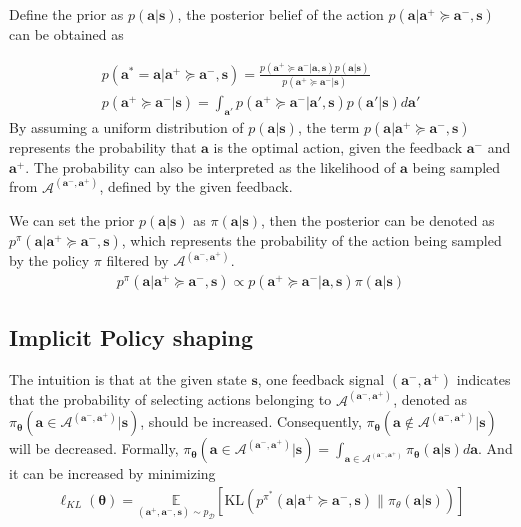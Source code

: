 Define the prior as $p(\bm a | \bm s)$,
the posterior belief of the action $ p (  \bm a |\bm a^+ \succeq \bm a^-,  \bm s)$ can be obtained as 


\begin{align}
p ( \bm a ^* = \bm a |  \bm a^+ \succeq \bm a^-,  \bm s) =\frac{ p (\bm a^+ \succeq \bm a^- | \bm a ,\bm s) p(\bm a | \bm s)}{p (\bm a^+ \succeq \bm a^- | \bm s)} \\
    p (\bm a^+ \succeq \bm a^- | \bm s) = \int_{\bm a'} p (\bm a^+ \succeq \bm a^-| \bm a', \bm s) p(\bm a'  | \bm s) d \bm a'
    \label{eq:posterior_data}
\end{align}
By assuming a uniform distribution of $p(\bm a | \bm s)$, the term $p ( \bm a |  \bm a^+ \succeq \bm a^-,  \bm s)$ represents the probability that $\bm a$ is the optimal action, given the feedback $\bm a^-$ and $\bm a^+$.
The probability can also be interpreted as the likelihood of $\bm a$ being sampled from $\mathcal{A}^{(\bm a^-, \bm a^+)}$, defined by the given feedback.

We can set the prior $p(\bm a | \bm s)$ as $\pi(\bm a| \bm s)$, then
the posterior can be denoted as $ p^{\pi} (  \bm a |\bm a^+ \succeq \bm a^-,  \bm s)$, which represents the probability of the action being sampled by the policy $\pi$ filtered by $\mathcal{A}^{(\bm a^-, \bm a^+)}$. 
\begin{align}
p^\pi ( \bm a |  \bm a^+ \succeq \bm a^-,  \bm s) \propto { p (\bm a^+ \succeq \bm a^- | \bm a ,\bm s) \pi(\bm a | \bm s)} 
\end{align}



\subsection{Implicit Policy shaping}

The intuition is that at the given state $\bm s$, 
one feedback signal $(\bm a^-, \bm a^+)$ indicates that the probability of selecting actions belonging to $\mathcal{A}^{(\bm a^-, \bm a^+)}$, denoted as $\pi_{\bm \theta}(\bm a \in \mathcal{A}^{(\bm a^-, \bm a^+)} | \bm s)$,  should be increased.
Consequently, $\pi_{\bm \theta}(\bm a \notin \mathcal{A}^{(\bm a^-, \bm a^+)}  | \bm s)$ will be decreased.
Formally, $\pi_{\bm \theta}(\bm a \in \mathcal{A}^{(\bm a^-, \bm a^+)}  | \bm s) = \int_{\bm a \in \mathcal{A}^{(\bm a^-, \bm a^+)}}  \pi_{\bm \theta}(\bm a|\bm s)    d \bm a$.  And it can be increased by minimizing 
\begin{align*}
    \ell_{KL}(\bm \theta) = \!\! \underset{(\bm{a}^{+}, \bm{a}^{-}, \bm{s}) \sim p_{\mathcal D}}{\mathbb{E}} \left[ \mathrm{KL}\left(p^{\pi^*}\!(\bm a|\bm a^+ \succeq \bm a^-, \bm s) \big\| \pi_{\theta}(\bm a | \bm s) \right) \right] 
\end{align*}


